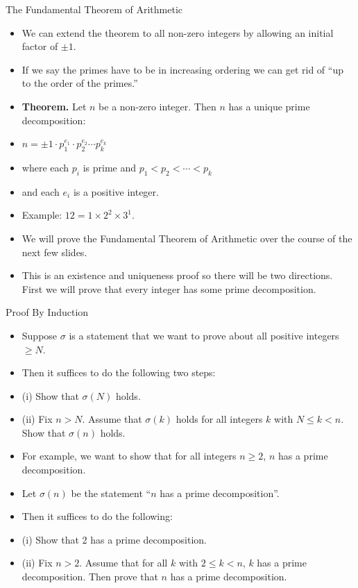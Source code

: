 \documentclass{beamer}
\begin{document}
\begin{frame}{The Fundamental Theorem of Arithmetic}

\begin{itemize}
  \item We can extend the theorem to all non-zero integers by allowing an initial factor of $\pm 1$.
  \item If we say the primes have to be in increasing ordering we can get rid of ``up to the order of the primes.''
  \item \textbf{Theorem.} Let $n$ be a non-zero integer. Then $n$ has a unique prime decomposition:
  \item $n=\pm1 \cdot p_1^{e_1} \cdot p_2^{e_2} \cdots p_k^{e_k}$
  \item where each $p_i$ is prime and $p_1<p_2<\cdots < p_k$
  \item and each $e_i$ is a positive integer.
  \item Example: $12 = 1 \times 2^2 \times 3^1$.
  \item We will prove the Fundamental Theorem of Arithmetic over the course of the next few slides.
  \item This is an existence and uniqueness proof so there will be two directions. First we
  will prove that every integer has some prime decomposition.
\end{itemize}

\end{frame}

\begin{frame}{Proof By Induction}

\begin{itemize}
  \item Suppose $\sigma$ is a statement that we want to prove about all positive integers $\geq N$.
  \item Then it suffices to do the following two steps:
  \item (i) Show that $\sigma(N)$ holds.
  \item (ii) Fix $n > N$. Assume that $\sigma(k)$ holds for all integers $k$ with $N\leq k < n$.  Show that $\sigma(n)$ holds.
  \item For example, we want to show that for all integers $n\geq 2$, $n$ has a prime decomposition.
  \item Let $\sigma(n)$ be the statement ``$n$ has a prime decomposition''.
  \item Then it suffices to do the following:
  \item (i) Show that 2 has a prime decomposition.
  \item (ii) Fix $n>2$. Assume that for all $k$ with $2\leq k < n$, $k$ has a prime decomposition. Then prove that $n$ has a
  prime decomposition.
\end{itemize}
\end{frame}
\end{document}
